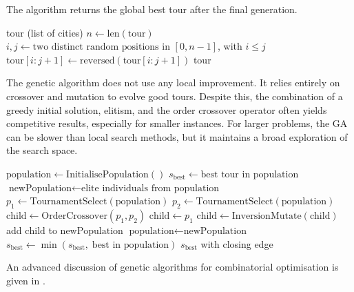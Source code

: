 The algorithm returns the global best tour after the final generation.
\begin{algorithm}
	\caption{Genetic: Inversion Mutation}
	\label{alg:ga-mutate}
	\begin{algorithmic}[1]
		\REQUIRE tour (list of cities)
		\STATE $n \gets \text{len}(\text{tour})$
		\STATE $i,j \gets \text{two distinct random positions in } [0,n-1]$, with $i \le j$
		\STATE $\text{tour}[i:j+1] \gets \text{reversed}(\text{tour}[i:j+1])$
		\RETURN $\text{tour}$
	\end{algorithmic}
\end{algorithm}



The genetic algorithm does not use any local improvement.
It relies entirely on crossover and mutation to evolve good tours.
Despite this, the combination of a greedy initial solution, elitism,
and the order crossover operator often yields competitive results, especially for smaller instances.
For larger problems, the GA can be slower than local search methods,
but it maintains a broad exploration of the search space.


\begin{algorithm}[H]
	\caption{Genetic Algorithm}
	\label{alg:ga}
	\begin{algorithmic}[1]
		\STATE $\text{population} \gets \text{InitialisePopulation}()$ 
		\STATE $s_{\text{best}} \gets \text{best tour in population}$
		\STATE $\text{newPopulation} \gets \text{elite individuals from population}$
		\STATE $p_1 \gets \text{TournamentSelect}(\text{population})$
		\STATE $p_2 \gets \text{TournamentSelect}(\text{population})$
		\STATE $\text{child} \gets \text{OrderCrossover}(p_1, p_2)$
		\ELSE
		\STATE $\text{child} \gets p_1$
		\ENDIF
		\STATE $\text{child} \gets \text{InversionMutate}(\text{child})$
		\ENDIF
		\STATE add $\text{child}$ to $\text{newPopulation}$
		\ENDWHILE
		\STATE $\text{population} \gets \text{newPopulation}$
		\STATE $s_{\text{best}} \gets \min(s_{\text{best}},\; \text{best in population})$
		\ENDFOR
		\RETURN $s_{\text{best}}$ with closing edge
	\end{algorithmic}
\end{algorithm}

An advanced discussion of genetic algorithms for combinatorial optimisation is given in \cite{whitleyNextGenerationGenetic2019}.
